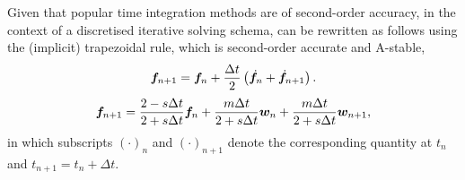 Given that popular time integration methods are of second-order accuracy, in the context of a discretised iterative solving schema,  can be rewritten as follows using the (implicit) trapezoidal rule, which is second-order accurate and A-stable,
\begin{gather}
\bm{f}_{n+1}=\bm{f}_n+\dfrac{\Delta{}t}{2}\left(\dot{\bm{f}}_n+\dot{\bm{f}}_{n+1}\right).
\end{gather}
\begin{gather}\label{eq:discretised_c}
\bm{f}_{n+1}=\dfrac{2-s\Delta{}t}{2+s\Delta{}t}\bm{f}_n+\dfrac{m\Delta{}t}{2+s\Delta{}t}\bm{w}_n+\dfrac{m\Delta{}t}{2+s\Delta{}t}\bm{w}_{n+1},
\end{gather}
in which subscripts $\left(\cdot\right)_n$ and $\left(\cdot\right)_{n+1}$ denote the corresponding quantity at $t_n$ and $t_{n+1}=t_n+\Delta{}t$.

